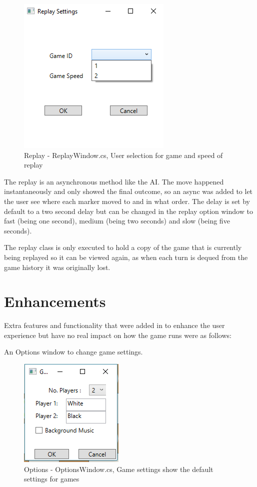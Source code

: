 \documentclass[10pt, a4paper]{article}
\begin{document}
 \begin{figure}[H]
  	\centering
  	\includegraphics[scale = 0.5]{ReplayWindow}
	\caption{Replay - ReplayWindow.cs, User selection for game and speed of replay}
  	\label{fig:nonfloat}
	\end{figure}

The replay is an asynchronous method like the AI. The move happened instantaneously and only showed the final outcome, so an async was added to let the user see where each marker moved to and in what order. The delay is set by default to a two second delay but can be changed in the replay option window to fast (being one second), medium (being two seconds) and slow (being five seconds).

The replay class is only executed to hold a copy of the game that is currently being replayed so it can be viewed again, as when each turn is dequed from the game history it was originally lost.

\section{Enhancements}
Extra features and functionality that were added in to enhance the user experience but have no real impact on how the game runs were as follows:

An Options window to change game settings.

\begin{figure}[H]
  	\centering
  	\includegraphics[scale = 0.5]{Options}
	\caption{Options - OptionsWindow.cs, Game settings show the default settings for games}
  	\label{fig:nonfloat}
	\end{figure}
\end{document}
